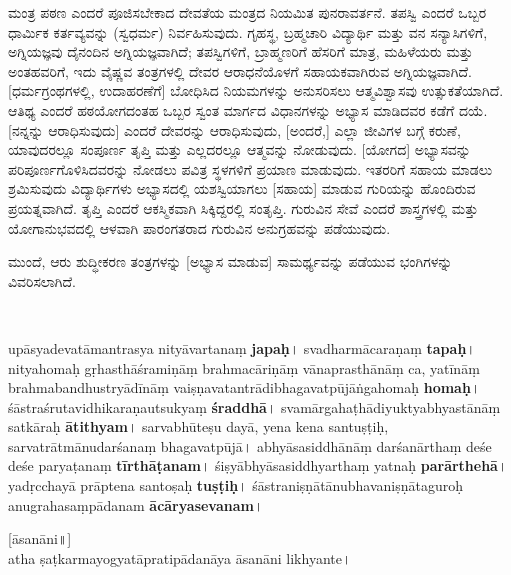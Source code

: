 \begin{kan}
ಮಂತ್ರ ಪಠಣ ಎಂದರೆ ಪೂಜಿಸಬೇಕಾದ ದೇವತೆಯ ಮಂತ್ರದ ನಿಯಮಿತ ಪುನರಾವರ್ತನೆ. ತಪಸ್ವಿ ಎಂದರೆ ಒಬ್ಬರ ಧಾರ್ಮಿಕ ಕರ್ತವ್ಯವನ್ನು (ಸ್ವಧರ್ಮ) ನಿರ್ವಹಿಸುವುದು. ಗೃಹಸ್ಥ, ಬ್ರಹ್ಮಚಾರಿ ವಿದ್ಯಾರ್ಥಿ ಮತ್ತು ವನ ಸನ್ಯಾಸಿಗಳಿಗೆ, ಅಗ್ನಿಯಜ್ಞವು ದೈನಂದಿನ ಅಗ್ನಿಯಜ್ಞವಾಗಿದೆ; ತಪಸ್ವಿಗಳಿಗೆ, ಬ್ರಾಹ್ಮಣರಿಗೆ ಹೆಸರಿಗೆ ಮಾತ್ರ, ಮಹಿಳೆಯರು ಮತ್ತು ಅಂತಹವರಿಗೆ, ಇದು ವೈಷ್ಣವ ತಂತ್ರಗಳಲ್ಲಿ ದೇವರ ಆರಾಧನೆಯೊಳಗೆ ಸಹಾಯಕವಾಗಿರುವ ಅಗ್ನಿಯಜ್ಞವಾಗಿದೆ. [ಧರ್ಮಗ್ರಂಥಗಳಲ್ಲಿ, ಉದಾಹರಣೆಗೆ] ಬೋಧಿಸಿದ ನಿಯಮಗಳನ್ನು ಅನುಸರಿಸಲು ಆತ್ಮವಿಶ್ವಾಸವು ಉತ್ಸುಕತೆಯಾಗಿದೆ. ಆತಿಥ್ಯ ಎಂದರೆ ಹಠಯೋಗದಂತಹ ಒಬ್ಬರ ಸ್ವಂತ ಮಾರ್ಗದ ವಿಧಾನಗಳನ್ನು ಅಭ್ಯಾಸ ಮಾಡಿದವರ ಕಡೆಗೆ ದಯೆ. [ನನ್ನನ್ನು ಆರಾಧಿಸುವುದು] ಎಂದರೆ ದೇವರನ್ನು ಆರಾಧಿಸುವುದು, [ಅಂದರೆ,] ಎಲ್ಲಾ ಜೀವಿಗಳ ಬಗ್ಗೆ ಕರುಣೆ, ಯಾವುದರಲ್ಲೂ ಸಂಪೂರ್ಣ ತೃಪ್ತಿ ಮತ್ತು ಎಲ್ಲದರಲ್ಲೂ ಆತ್ಮವನ್ನು ನೋಡುವುದು. [ಯೋಗದ] ಅಭ್ಯಾಸವನ್ನು ಪರಿಪೂರ್ಣಗೊಳಿಸಿದವರನ್ನು ನೋಡಲು ಪವಿತ್ರ ಸ್ಥಳಗಳಿಗೆ ಪ್ರಯಾಣ ಮಾಡುವುದು. ಇತರರಿಗೆ ಸಹಾಯ ಮಾಡಲು ಶ್ರಮಿಸುವುದು ವಿದ್ಯಾರ್ಥಿಗಳು ಅಭ್ಯಾಸದಲ್ಲಿ ಯಶಸ್ವಿಯಾಗಲು [ಸಹಾಯ] ಮಾಡುವ ಗುರಿಯನ್ನು ಹೊಂದಿರುವ ಪ್ರಯತ್ನವಾಗಿದೆ. ತೃಪ್ತಿ ಎಂದರೆ ಆಕಸ್ಮಿಕವಾಗಿ ಸಿಕ್ಕಿದ್ದರಲ್ಲಿ ಸಂತೃಪ್ತಿ. ಗುರುವಿನ ಸೇವೆ ಎಂದರೆ ಶಾಸ್ತ್ರಗಳಲ್ಲಿ ಮತ್ತು ಯೋಗಾನುಭವದಲ್ಲಿ ಆಳವಾಗಿ ಪಾರಂಗತರಾದ ಗುರುವಿನ ಅನುಗ್ರಹವನ್ನು ಪಡೆಯುವುದು.
\bigskip

ಮುಂದೆ, ಆರು ಶುದ್ಧೀಕರಣ ತಂತ್ರಗಳನ್ನು [ಅಭ್ಯಾಸ ಮಾಡುವ] ಸಾಮರ್ಥ್ಯವನ್ನು ಪಡೆಯುವ ಭಂಗಿಗಳನ್ನು ವಿವರಿಸಲಾಗಿದೆ.
\end{kan}

\newpage

~\vskip 1cm

\begin{sans}
upāsyadevatāmantrasya nityāvartanaṃ \textbf{japaḥ}\!। svadharmācaraṇaṃ \textbf{tapaḥ}\!। nityahomaḥ gṛhasthāśramiṇāṃ brahmacāriṇāṃ vānaprasthānāṃ ca\endnote{ca] P, \textit{omitted.} M}, yatīnāṃ brahmabandhustryādīnāṃ\endnote{brahma°] P, braṃha° M} vaiṣṇavatantrādibhagavatpūjāṅgahomaḥ \textbf{homaḥ}\!। śāstraśrutavidhikaraṇautsukyaṃ \textbf{śraddhā}\!। svamārgahaṭhādiyuktyabhyastānāṃ satkāraḥ \textbf{ātithyam}\!। sarvabhūteṣu dayā, yena kena santuṣṭiḥ, sarvatrātmānudarśanaṃ bhagavatpūjā\!।  abhyāsasiddhānāṃ darśanārthaṃ deśe deśe  paryaṭanaṃ \textbf{tīrthāṭanam}\!। śiṣyābhyāsasiddhyarthaṃ\endnote{°siddhy°] P, °sidhy° M} yatnaḥ \textbf{parārthehā}\!। yadṛcchayā prāptena santoṣaḥ \textbf{tuṣṭiḥ}\!। śāstraniṣṇātānubhavaniṣṇātaguroḥ anugrahasaṃpādanam \textbf{ācāryasevanam}\!।
\medskip

[āsanāni\!॥]\\ %
atha ṣaṭkarmayogyatāpratipādanāya āsanāni likhyante\!।
\end{sans}
\vskip 1cm

